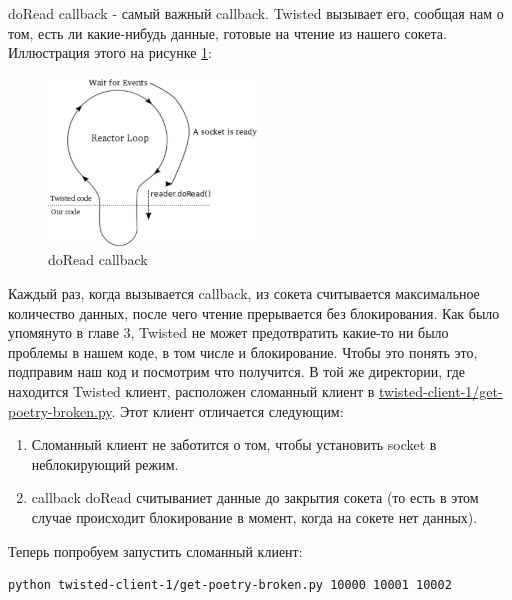 doRead callback - самый важный callback. Twisted 
вызывает его, сообщая нам  о том, есть ли какие-нибудь данные, 
готовые на чтение из нашего сокета. Иллюстрация этого на 
рисунке \ref{fig:reactor-doread}:

\begin{figure}[h]
\begin{center}
    \includegraphics[width=0.5\textwidth]{images/reactor-doread.pdf}
    \caption{doRead callback\label{fig:reactor-doread}}
\end{center}
\end{figure}

Каждый раз, когда вызывается callback, 
из сокета считывается максимальное количество данных, после 
чего чтение прерывается без блокирования. Как было упомянуто в 
главе 3, Twisted не может предотвратить какие-то ни было 
проблемы в нашем коде, в том числе и блокирование. Чтобы это понять 
это, подправим наш код и посмотрим что получится. В той же 
директории, где находится Twisted клиент, расположен сломанный 
клиент в \href{http://github.com/jdavisp3/twisted-intro/blob/master/twisted-client-1/get-poetry-broken.py}{twisted-client-1/get-poetry-broken.py}. Этот клиент отличается следующим:

\begin{enumerate}
\item Сломанный клиент не заботится о том, чтобы установить socket в неблокирующий режим. 
\item callback doRead считываниет данные до закрытия сокета (то есть в этом случае 
происходит блокирование в момент, когда на сокете нет данных).
\end{enumerate}

Теперь попробуем запустить сломанный клиент:

\begin{scriptsize}\begin{verbatim}
python twisted-client-1/get-poetry-broken.py 10000 10001 10002
\end{verbatim}\end{scriptsize}

